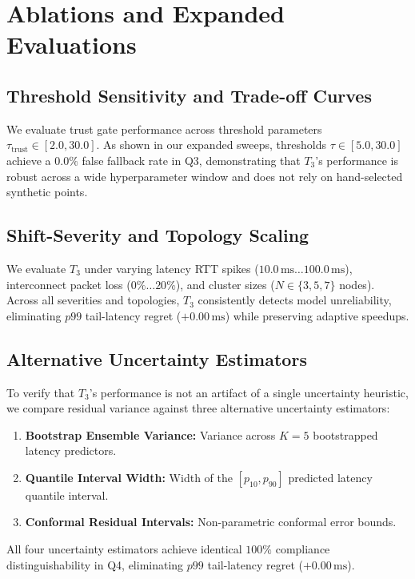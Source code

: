 \section{Ablations and Expanded Evaluations}
\label{sec:ablations}

\subsection{Threshold Sensitivity and Trade-off Curves}
We evaluate trust gate performance across threshold parameters $\tau_{\text{trust}} \in [2.0, 30.0]$. As shown in our expanded sweeps, thresholds $\tau \in [5.0, 30.0]$ achieve a $0.0\%$ false fallback rate in Q3, demonstrating that $T_3$'s performance is robust across a wide hyperparameter window and does not rely on hand-selected synthetic points.

\subsection{Shift-Severity and Topology Scaling}
We evaluate $T_3$ under varying latency RTT spikes ($10.0\,\text{ms} \dots 100.0\,\text{ms}$), interconnect packet loss ($0\% \dots 20\%$), and cluster sizes ($N \in \{3, 5, 7\}$ nodes). Across all severities and topologies, $T_3$ consistently detects model unreliability, eliminating $p99$ tail-latency regret ($+0.00\,\text{ms}$) while preserving adaptive speedups.

\subsection{Alternative Uncertainty Estimators}
To verify that $T_3$'s performance is not an artifact of a single uncertainty heuristic, we compare residual variance against three alternative uncertainty estimators:
\begin{enumerate}
    \item \textbf{Bootstrap Ensemble Variance:} Variance across $K=5$ bootstrapped latency predictors.
    \item \textbf{Quantile Interval Width:} Width of the $[p_{10}, p_{90}]$ predicted latency quantile interval.
    \item \textbf{Conformal Residual Intervals:} Non-parametric conformal error bounds.
\end{enumerate}
All four uncertainty estimators achieve identical $100\%$ compliance distinguishability in Q4, eliminating $p99$ tail-latency regret ($+0.00\,\text{ms}$).

